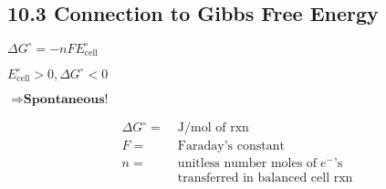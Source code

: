 \subsection{10.3 Connection to Gibbs Free Energy}
\vspace*{-0.5em}
    \begin{minipage}{0.99\linewidth}
        \begin{minipage}{0.32\linewidth}
            \centerline{$\Delta G^\circ = -n F E^\circ_\text{cell}$}
            \vspace*{2em}
            \centerline{$E^\circ_\text{cell} > 0, \Delta G^\circ < 0$}
            \vspace*{0.5em}
            \centerline{$\Rightarrow \textbf{Spontaneous!}$}
        \end{minipage}
        \begin{minipage}{0.61\linewidth}
            \begin{align*}
                \Delta G^\circ =& \; \textrm{J/mol of rxn}\\
                F =& \; \textrm{Faraday's constant}\\
                n =& \; \textrm{unitless number moles of} \; e^- \textrm{'s}\\
                & \; \textrm{transferred in balanced cell rxn}\\
            \end{align*}
        \end{minipage}
    \end{minipage}